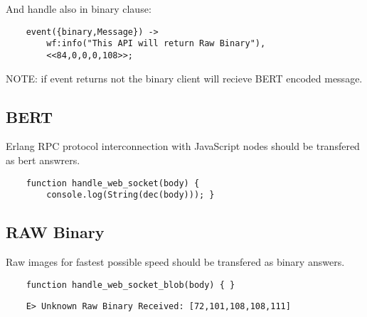 And handle also in binary clause:

\vspace{1\baselineskip}
\begin{lstlisting}
    event({binary,Message}) ->
        wf:info("This API will return Raw Binary"),
        <<84,0,0,0,108>>;
\end{lstlisting}
\vspace{1\baselineskip}

NOTE: if event returns not the binary client will recieve BERT encoded message.

\subsection*{BERT}

Erlang RPC protocol interconnection with JavaScript nodes should be transfered as bert answrers.

\begin{lstlisting}
    function handle_web_socket(body) {
        console.log(String(dec(body))); }
\end{lstlisting}

\subsection*{RAW Binary}

Raw images for fastest possible speed should be transfered as binary answers.

\begin{lstlisting}
    function handle_web_socket_blob(body) { }
\end{lstlisting}

\begin{lstlisting}
    E> Unknown Raw Binary Received: [72,101,108,108,111]
\end{lstlisting}
 
